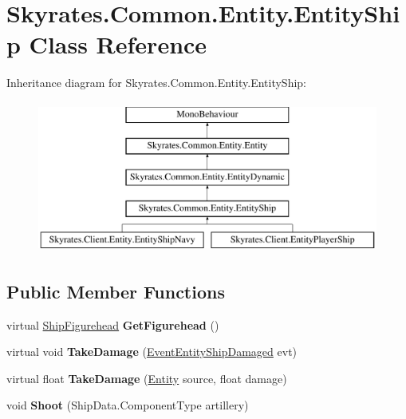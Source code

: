 \hypertarget{class_skyrates_1_1_common_1_1_entity_1_1_entity_ship}{\section{Skyrates.\-Common.\-Entity.\-Entity\-Ship Class Reference}
\label{class_skyrates_1_1_common_1_1_entity_1_1_entity_ship}
}
Inheritance diagram for Skyrates.\-Common.\-Entity.\-Entity\-Ship\-:\begin{figure}[H]
\begin{center}
\leavevmode
\includegraphics[height=5.000000cm]{class_skyrates_1_1_common_1_1_entity_1_1_entity_ship}
\end{center}
\end{figure}
\subsection*{Public Member Functions}
\begin{DoxyCompactItemize}
\item 
\hypertarget{class_skyrates_1_1_common_1_1_entity_1_1_entity_ship_a1ad193ad3946e8c0ab9128d1d2c42368}{virtual \hyperlink{class_skyrates_1_1_client_1_1_ship_1_1_ship_figurehead}{Ship\-Figurehead} {\bfseries Get\-Figurehead} ()}\label{class_skyrates_1_1_common_1_1_entity_1_1_entity_ship_a1ad193ad3946e8c0ab9128d1d2c42368}

\item 
\hypertarget{class_skyrates_1_1_common_1_1_entity_1_1_entity_ship_a1a0df5a0402dbe8a7d402225121f0084}{virtual void {\bfseries Take\-Damage} (\hyperlink{class_skyrates_1_1_client_1_1_game_1_1_event_1_1_event_entity_ship_damaged}{Event\-Entity\-Ship\-Damaged} evt)}\label{class_skyrates_1_1_common_1_1_entity_1_1_entity_ship_a1a0df5a0402dbe8a7d402225121f0084}

\item 
\hypertarget{class_skyrates_1_1_common_1_1_entity_1_1_entity_ship_a78d58368b61362a3c8fce1eb1b6eeadc}{virtual float {\bfseries Take\-Damage} (\hyperlink{class_skyrates_1_1_common_1_1_entity_1_1_entity}{Entity} source, float damage)}\label{class_skyrates_1_1_common_1_1_entity_1_1_entity_ship_a78d58368b61362a3c8fce1eb1b6eeadc}

\item 
\hypertarget{class_skyrates_1_1_common_1_1_entity_1_1_entity_ship_a9283fc63dfbee1d5e87b391e343fea83}{void {\bfseries Shoot} (Ship\-Data.\-Component\-Type artillery)}\label{class_skyrates_1_1_common_1_1_entity_1_1_entity_ship_a9283fc63dfbee1d5e87b391e343fea83}

\end{DoxyCompactItemize}
